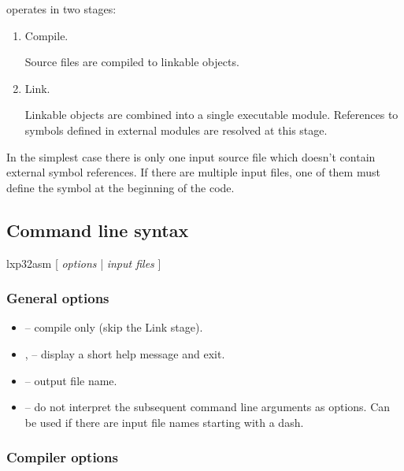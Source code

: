 \documentclass[a4paper,12pt,twoside,extrafontsizes]{memoir}
\begin{document}
 operates in two stages:

\begin{enumerate}
	\item Compile.
	
	Source files are compiled to linkable objects.
	
	\item Link.
	
	Linkable objects are combined into a single executable module. References to symbols defined in external modules are resolved at this stage.
\end{enumerate}

In the simplest case there is only one input source file which doesn't contain external symbol references. If there are multiple input files, one of them must define the  symbol at the beginning of the code.

\subsection{Command line syntax}
\label{subsec:assemblercmdline}

\begin{codepar}
    lxp32asm [ \emph{options} | \emph{input files} ]
\end{codepar}

\subsubsection{General options}

\begin{itemize}
	\item {} -- compile only (skip the Link stage).
	
	\item {},  -- display a short help message and exit.
	
	\item {} -- output file name.
	
	\item \shellcmd{--} -- do not interpret the subsequent command line arguments as options. Can be used if there are input file names starting with a dash.
\end{itemize}

\subsubsection{Compiler options}
\end{document}
